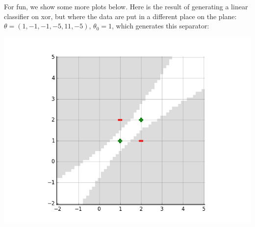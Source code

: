 For fun, we show some more plots below.  Here is the result of generating a linear classifier
on {\sc xor}, but where the data are put in a different
place on the plane: %
$\theta = ( 1, -1, -1, -5, 11, -5)$, $\theta_0 =  1$, which generates
this separator:
\begin{examplebox}
  \begin{center}
    \includegraphics[scale=0.3]{figures/feature_representation_2.png}
  \end{center}
\end{examplebox}

